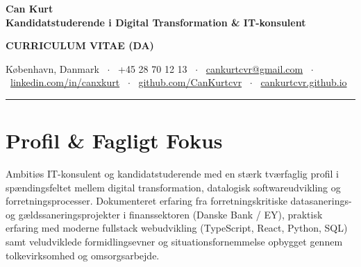 \documentclass[9.5pt,a4paper]{article}
\begin{document}
\begin{minipage}[t]{0.70\textwidth}
    {\fontsize{22}{25}\selectfont\textbf{\color{primary}Can Kurt}} \\[2pt]
    {\fontsize{9.5}{12}\selectfont\textbf{\color{accent}Kandidatstuderende i Digital Transformation \& IT-konsulent}}
\end{minipage}
\hfill
\begin{minipage}[t]{0.28\textwidth}
    \raggedleft
    {\fontsize{8.5}{11}\selectfont\color{mutedgray}\textbf{CURRICULUM VITAE (DA)}}
\end{minipage}

\vspace{5pt}
{\fontsize{8.5}{11}\selectfont\color{darkslate}
København, Danmark \ $\cdot$ \ 
+45 28 70 12 13 \ $\cdot$ \ 
\href{mailto:cankurtcvr@gmail.com}{cankurtcvr@gmail.com} \ $\cdot$ \ 
\href{https://linkedin.com/in/canxkurt}{linkedin.com/in/canxkurt} \ $\cdot$ \
\href{https://github.com/CanKurtcvr}{github.com/CanKurtcvr} \ $\cdot$ \ 
\href{https://cankurtcvr.github.io}{cankurtcvr.github.io}
}

\vspace{3pt}
{\color{primary}\rule{\linewidth}{1.2pt}}
\vspace{1pt}

\section{Profil \& Fagligt Fokus}
{\fontsize{8.8}{12}\selectfont\color{darkslate}
Ambitiøs IT-konsulent og kandidatstuderende med en stærk tværfaglig profil i spændingsfeltet mellem digital transformation, datalogisk softwareudvikling og forretningsprocesser. Dokumenteret erfaring fra forretningskritiske datasanerings- og gældssaneringsprojekter i finanssektoren (Danske Bank / EY), praktisk erfaring med moderne fullstack webudvikling (TypeScript, React, Python, SQL) samt veludviklede formidlingsevner og situationsfornemmelse opbygget gennem tolkevirksomhed og omsorgsarbejde.
}

\end{document}
